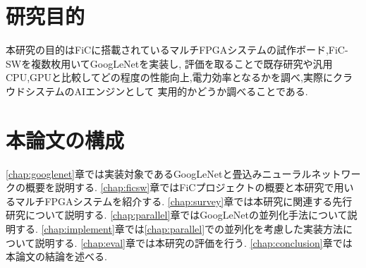 {  \section{研究目的}
  \label{sec:purpose}
  本研究の目的はFiCに搭載されているマルチFPGAシステムの試作ボード,FiC-SWを複数枚用いてGoogLeNetを実装し,
  評価を取ることで既存研究や汎用CPU,GPUと比較してどの程度の性能向上,電力効率となるかを調べ,実際にクラウドシステムのAIエンジンとして
  実用的かどうか調べることである.

  \section{本論文の構成}
  \label{sec:composition}
  \ref{chap:googlenet}章では実装対象であるGoogLeNetと畳込みニューラルネットワークの概要を説明する.
  \ref{chap:ficsw}章ではFiCプロジェクトの概要と本研究で用いるマルチFPGAシステムを紹介する.
  \ref{chap:survey}章では本研究に関連する先行研究について説明する.
  \ref{chap:parallel}章ではGoogLeNetの並列化手法について説明する.
  \ref{chap:implement}章では\ref{chap:parallel}での並列化を考慮した実装方法について説明する. 
  \ref{chap:eval}章では本研究の評価を行う. 
  \ref{chap:conclusion}章では本論文の結論を述べる.
}
